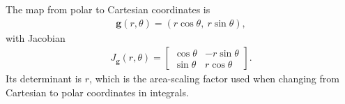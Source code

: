 \documentclass[a4paper, 12pt]{book}
\begin{document}
\begin{example}
    The map from polar to Cartesian coordinates is
    \begin{align}
        \mathbf{g}(r,\theta) = (r\cos\theta,\ r\sin\theta),
    \end{align}
    with Jacobian
    \begin{align}
        J_{\mathbf{g}}(r,\theta) =
        \begin{bmatrix}
            \cos\theta & -r\sin\theta\\
            \sin\theta & r\cos\theta
        \end{bmatrix}.
    \end{align}
    Its determinant is $r$, which is the area-scaling factor used when changing from
    Cartesian to polar coordinates in integrals.
\end{example}
\end{document}
